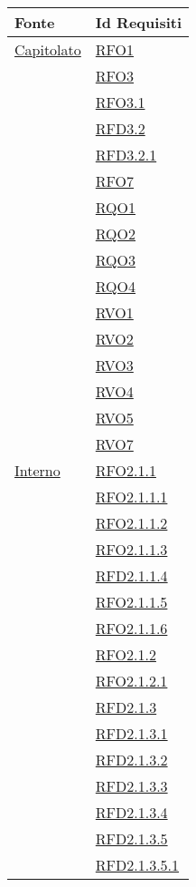 \normalsize
\begin{longtable}{|>{\centering}m{5cm}|m{5cm}<{\centering}|}
\hline
\textbf{Fonte} & \textbf{Id Requisiti}\\
\hline
\endhead
\hyperlink{Capitolato}{Capitolato} & \hyperlink{RFO1}{RFO1}\\
& \hyperlink{RFO3}{RFO3}\\
& \hyperlink{RFO3.1}{RFO3.1}\\
& \hyperlink{RFD3.2}{RFD3.2}\\
& \hyperlink{RFD3.2.1}{RFD3.2.1}\\
& \hyperlink{RFO7}{RFO7}\\
& \hyperlink{RQO1}{RQO1}\\
& \hyperlink{RQO2}{RQO2}\\
& \hyperlink{RQO3}{RQO3}\\
& \hyperlink{RQO4}{RQO4}\\
& \hyperlink{RVO1}{RVO1}\\
& \hyperlink{RVO2}{RVO2}\\
& \hyperlink{RVO3}{RVO3}\\
& \hyperlink{RVO4}{RVO4}\\
& \hyperlink{RVO5}{RVO5}\\
& \hyperlink{RVO7}{RVO7}\\ \hline
\hyperlink{Interno}{Interno} & \hyperlink{RFO2.1.1}{RFO2.1.1}\\
& \hyperlink{RFO2.1.1.1}{RFO2.1.1.1}\\
& \hyperlink{RFO2.1.1.2}{RFO2.1.1.2}\\
& \hyperlink{RFO2.1.1.3}{RFO2.1.1.3}\\
& \hyperlink{RFD2.1.1.4}{RFD2.1.1.4}\\
& \hyperlink{RFO2.1.1.5}{RFO2.1.1.5}\\
& \hyperlink{RFO2.1.1.6}{RFO2.1.1.6}\\
& \hyperlink{RFO2.1.2}{RFO2.1.2}\\
& \hyperlink{RFO2.1.2.1}{RFO2.1.2.1}\\
& \hyperlink{RFD2.1.3}{RFD2.1.3}\\
& \hyperlink{RFD2.1.3.1}{RFD2.1.3.1}\\
& \hyperlink{RFD2.1.3.2}{RFD2.1.3.2}\\
& \hyperlink{RFD2.1.3.3}{RFD2.1.3.3}\\
& \hyperlink{RFD2.1.3.4}{RFD2.1.3.4}\\
& \hyperlink{RFD2.1.3.5}{RFD2.1.3.5}\\
& \hyperlink{RFD2.1.3.5.1}{RFD2.1.3.5.1}\\

\end{longtable}

